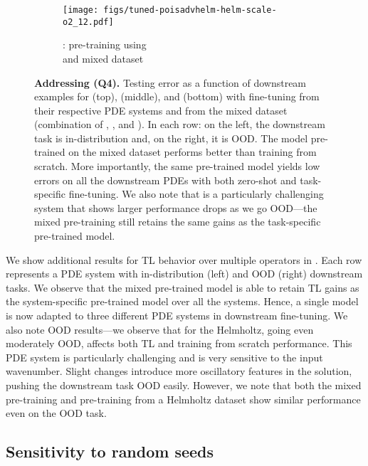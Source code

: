 \begin{figure*}
\begin{subfigure}{.5\textwidth}
  \centering
  \texttt{[image: figs/tuned-poisadvhelm-helm-scale-o2\_12.pdf]}  
  \caption{\sysCtwotwelve{}: pre-training using \\ \sysConeten{}  and mixed dataset}
  \label{fig:helm-poisadvhelm-2-12}
\end{subfigure}
\caption{\textbf{Addressing (Q4).} Testing error as a function of downstream examples  for \sysA{} (top), \sysB{} (middle), and \sysC{} (bottom) with fine-tuning from their respective PDE systems and from the mixed dataset (combination of \sysA{}, \sysB{}, and \sysC{}). In each row: on the left, the downstream task is in-distribution and, on the right, it is OOD. The model pre-trained on the mixed dataset performs better than training from scratch. More importantly, the same pre-trained model yields low errors on all the downstream PDEs with both zero-shot and task-specific fine-tuning. We also note that \sysC{} is a particularly challenging system that shows larger performance drops as we go OOD---the mixed pre-training still retains the same gains as the task-specific pre-trained model.}
\label{fig:mixed}
\end{figure*}
We show additional results for TL behavior over multiple operators in . Each row represents a PDE system with in-distribution (left) and OOD (right) downstream tasks. We observe that the mixed pre-trained model is able to retain TL gains as the system-specific pre-trained model over all the systems. Hence, a single model is now adapted to three different PDE systems in downstream fine-tuning. We also note \sysC{} OOD results---we observe that for the Helmholtz, going even moderately OOD, affects both TL and training from scratch performance. This PDE system is particularly challenging and is very sensitive to the input wavenumber. Slight changes introduce more oscillatory features in the solution, pushing the downstream task OOD easily. However, we note that both the mixed pre-training and pre-training from a Helmholtz dataset show similar performance even on the OOD task.

\subsection{Sensitivity to random seeds}
\label{sec:sens}

